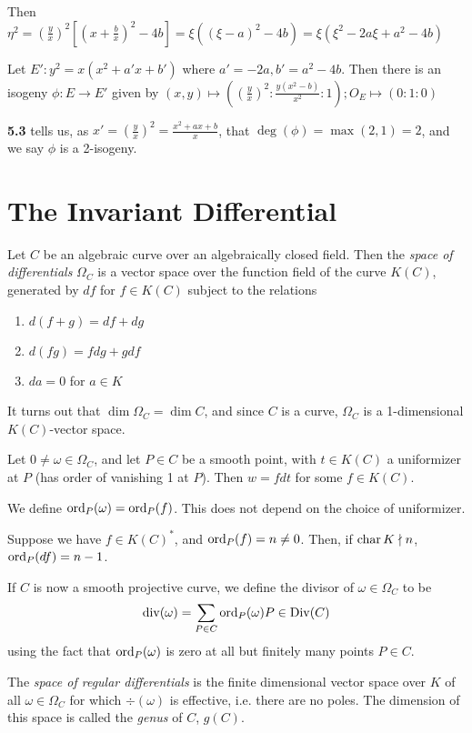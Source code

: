 \documentclass[10pt,a4paper]{article}
\begin{document}
Then $\eta^2=\left(\frac{y}{x}\right)^2\left[\left(x+\frac{b}{x}\right)^2-4b\right] = \xi\left((\xi-a)^2-4b\right) = \xi(\xi^2-2a\xi+a^2-4b)$

Let $E': y^2=x(x^2+a'x+b')$ where $a' = -2a, b'=a^2-4b$. Then there is an isogeny $\phi:E \to E'$ given by $(x, y) \mapsto \left(\left(\frac{y}{x}\right)^2:\frac{y(x^2-b)}{x^2}:1\right); O_E \mapsto (0:1:0)$

\textbf{5.3} tells us, as $x' = \left(\frac{y}{x}\right)^2 = \frac{x^2+ax+b}{x}$, that $\deg(\phi) = \max(2,1) = 2$, and we say $\phi$ is a 2-isogeny.

\section{The Invariant Differential}
Let $C$ be an algebraic curve over an algebraically closed field. Then the \emph{space of differentials} $\Omega_C$ is a vector space over the function field of the curve $K(C)$, generated by $df$ for $f \in K(C)$ subject to the relations
\begin{enumerate}
  \item $d(f+g) = df+dg$
  \item $d(fg) = fdg+gdf$
  \item $da = 0$ for $a \in K$
\end{enumerate}
It turns out that $\dim \Omega_C = \dim C$, and since $C$ is a curve, $\Omega_C$ is a 1-dimensional $K(C)$-vector space.

Let $0\neq \omega \in \Omega_C$, and let $P \in C$ be a smooth point, with $t \in K(C)$ a uniformizer at $P$ (has order of vanishing 1 at $P$). Then $w = fdt$ for some $f \in K(C)$.

We define $\operatorname{ord}_P(\omega) = \operatorname{ord}_P(f)$. This does not depend on the choice of uniformizer.

Suppose we have $f \in K(C)^\ast$, and $\operatorname{ord}_P(f) = n \neq 0$. Then, if $\operatorname{char} K \nmid n$, $\operatorname{ord}_P(df) = n-1$.

If $C$ is now a smooth projective curve, we define the divisor of $\omega \in \Omega_C$ to be
\[\operatorname{div}(\omega) = \sum_{P \in C} \operatorname{ord}_P(\omega) P \in \operatorname{Div}(C)\]
using the fact that $\operatorname{ord}_P(\omega)$ is zero at all but finitely many points $P \in C$.

The \emph{space of regular differentials} is the finite dimensional vector space over $K$ of all $\omega \in \Omega_C$ for which $\div(\omega)$ is effective, i.e. there are no poles. The dimension of this space is called the \emph{genus} of $C$, $g(C)$.
\end{document}
